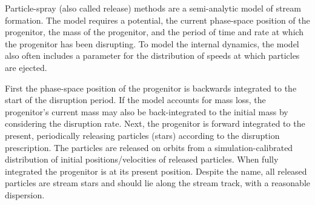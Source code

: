 \documentclass[fleqn,usenatbib]{mnras}
\begin{document}
    Particle-spray (also called release) methods are a semi-analytic model of
    stream formation. The model requires a potential, the current phase-space
    position of the progenitor, the mass of the progenitor, and the period of
    time and rate at which the progenitor has been disrupting. To model the
    internal dynamics, the model also often includes a parameter for the
    distribution of speeds at which particles are ejected.

    First the phase-space position of the progenitor is backwards integrated to
    the start of the disruption period. If the model accounts for mass loss, the
    progenitor's current mass may also be back-integrated to the initial mass by
    considering the disruption rate. Next, the progenitor is forward integrated
    to the present, periodically releasing particles (stars) according to the
    disruption prescription. The particles are released on orbits from a
    simulation-calibrated distribution of initial positions/velocities of
    released particles. When fully integrated the progenitor is at its present
    position. Despite the name, all released particles are stream stars and
    should lie along the stream track, with a reasonable dispersion.
\end{document}
